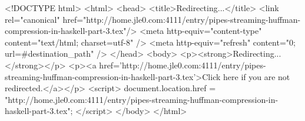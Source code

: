 <!DOCTYPE html>
<html>
<head>
<title>Redirecting...</title>
<link rel="canonical" href="http://home.jle0.com:4111/entry/pipes-streaming-huffman-compression-in-haskell-part-3.tex"/>
<meta http-equiv="content-type" content="text/html; charset=utf-8" />
<meta http-equiv="refresh" content="0; url=#{destination_path}" />
</head>
<body>
  <p><strong>Redirecting...</strong></p>
  <p><a href='http://home.jle0.com:4111/entry/pipes-streaming-huffman-compression-in-haskell-part-3.tex'>Click here if you are not redirected.</a></p>
  <script>
    document.location.href = "http://home.jle0.com:4111/entry/pipes-streaming-huffman-compression-in-haskell-part-3.tex";
  </script>
</body>
</html>
